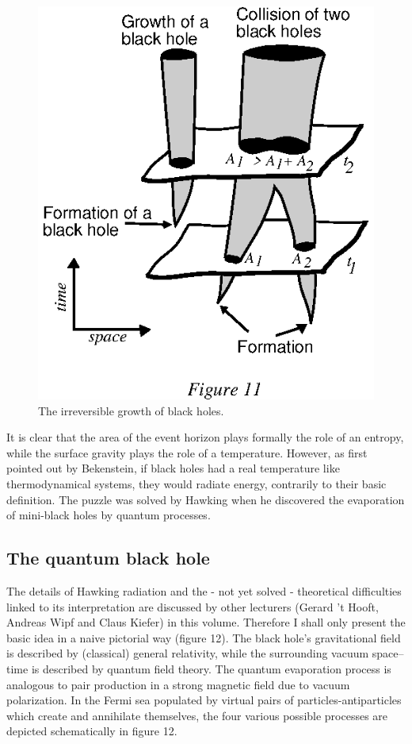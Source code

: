 \documentclass{lamuphys}
\begin{document}
\begin{figure}[tb]
  \begin{center}
    \leavevmode
    \includegraphics{area.ps}       
    \caption{The irreversible growth of black holes.}
  \end{center}
\end{figure}
It is clear that the area of the event horizon plays formally the
role of an entropy, while the surface gravity plays the role
of a temperature. However, as first pointed out by
Bekenstein, if black holes had a real temperature like thermodynamical systems,
they would radiate energy, contrarily to their basic definition. The puzzle
was solved by Hawking when he discovered the evaporation of mini-black
holes by quantum processes.

\subsection {The quantum black hole}

The details of Hawking radiation and the - not yet
solved - theoretical difficulties linked to its interpretation are discussed by other lecturers 
(Gerard 't Hooft, Andreas Wipf and Claus
Kiefer) in this volume. Therefore I shall only present the basic 
idea in a naive pictorial way (figure 12).
The black hole's gravitational field is described by (classical) general
relativity, while the surrounding vacuum space--time is described by quantum field theory.
The quantum evaporation process is analogous to pair production in a strong
magnetic field due to vacuum polarization. In the Fermi sea populated by
virtual pairs of particles-antiparticles which create and annihilate themselves,
the four various possible processes are depicted schematically in figure 
12.
\end{document}
